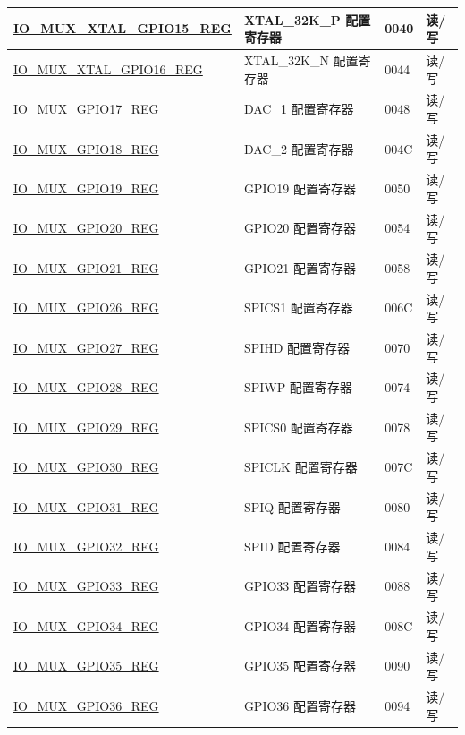 \documentclass[main.tex]{subfiles}
\begin{document}
\begin{longtable}{ | p{5cm} | p{7.5cm} | p{2cm} | p{1cm} | }
\hyperref[regdesc:IOMUXnREG]{IO\_MUX\_XTAL\_GPIO15\_REG} & XTAL\_32K\_P 配置寄存器 & \hexprefix{}0040 & 读/写 \\ \hline
\hyperref[regdesc:IOMUXnREG]{IO\_MUX\_XTAL\_GPIO16\_REG} & XTAL\_32K\_N 配置寄存器 & \hexprefix{}0044 & 读/写 \\ \hline
\hyperref[regdesc:IOMUXnREG]{IO\_MUX\_GPIO17\_REG} & DAC\_1 配置寄存器 & \hexprefix{}0048 & 读/写 \\ \hline
\hyperref[regdesc:IOMUXnREG]{IO\_MUX\_GPIO18\_REG} & DAC\_2 配置寄存器 & \hexprefix{}004C & 读/写 \\ \hline
\hyperref[regdesc:IOMUXnREG]{IO\_MUX\_GPIO19\_REG} & GPIO19 配置寄存器 & \hexprefix{}0050 & 读/写 \\ \hline
\hyperref[regdesc:IOMUXnREG]{IO\_MUX\_GPIO20\_REG} & GPIO20 配置寄存器 & \hexprefix{}0054 & 读/写 \\ \hline
\hyperref[regdesc:IOMUXnREG]{IO\_MUX\_GPIO21\_REG} & GPIO21 配置寄存器 & \hexprefix{}0058 & 读/写 \\ \hline
\hyperref[regdesc:IOMUXnREG]{IO\_MUX\_GPIO26\_REG} & SPICS1 配置寄存器 & \hexprefix{}006C & 读/写 \\ \hline
\hyperref[regdesc:IOMUXnREG]{IO\_MUX\_GPIO27\_REG} & SPIHD 配置寄存器 & \hexprefix{}0070 & 读/写 \\ \hline
\hyperref[regdesc:IOMUXnREG]{IO\_MUX\_GPIO28\_REG} & SPIWP 配置寄存器 & \hexprefix{}0074 & 读/写 \\ \hline
\hyperref[regdesc:IOMUXnREG]{IO\_MUX\_GPIO29\_REG} & SPICS0 配置寄存器 & \hexprefix{}0078 & 读/写 \\ \hline
\hyperref[regdesc:IOMUXnREG]{IO\_MUX\_GPIO30\_REG} & SPICLK 配置寄存器 & \hexprefix{}007C & 读/写 \\ \hline
\hyperref[regdesc:IOMUXnREG]{IO\_MUX\_GPIO31\_REG} & SPIQ 配置寄存器 & \hexprefix{}0080 & 读/写 \\ \hline
\hyperref[regdesc:IOMUXnREG]{IO\_MUX\_GPIO32\_REG} & SPID 配置寄存器 & \hexprefix{}0084 & 读/写 \\ \hline
\hyperref[regdesc:IOMUXnREG]{IO\_MUX\_GPIO33\_REG} & GPIO33 配置寄存器 & \hexprefix{}0088 & 读/写 \\ \hline
\hyperref[regdesc:IOMUXnREG]{IO\_MUX\_GPIO34\_REG} & GPIO34 配置寄存器 & \hexprefix{}008C & 读/写 \\ \hline
\hyperref[regdesc:IOMUXnREG]{IO\_MUX\_GPIO35\_REG} & GPIO35 配置寄存器 & \hexprefix{}0090 & 读/写 \\ \hline
\hyperref[regdesc:IOMUXnREG]{IO\_MUX\_GPIO36\_REG} & GPIO36 配置寄存器 & \hexprefix{}0094 & 读/写 \\ \hline

\end{longtable}
\end{document}
